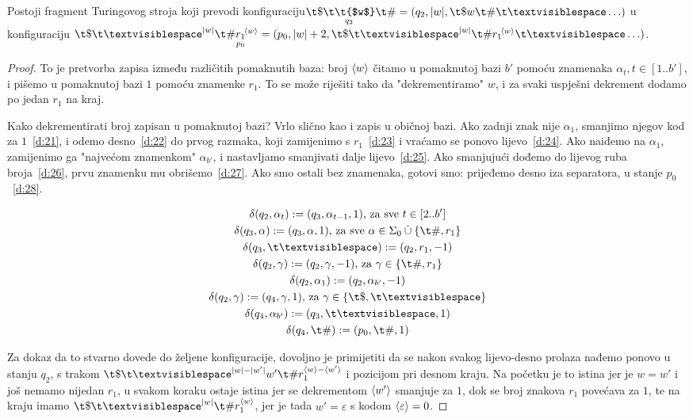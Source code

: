 \begin{lema}[{name=[drugi fragment transpiliranog stroja]}]\label{lm:faza2}
Postoji fragment Turingovog stroja koji prevodi konfiguraciju\newline $\T{\$}{q_2}{\t{$w$}}{\#}=(q_2,\dulj w,\t\$w\t\#\bl\ldots)$ u konfiguraciju $\t\$\bl^{\dulj w}\t\#\underset{\mathclap{p_0}}{r_1}^{\!\kr w}=(p_0,\dulj w+2,\t\$\bl^{\dulj w}\t\#r_1{}^{\!\kr w}\bl\ldots)$.
\end{lema}
\begin{proof}
To je pretvorba zapisa između različitih pomaknutih baza: broj $\langle w\rangle$ čitamo u pomaknutoj bazi $b'$ pomoću znamenaka $\alpha_t,t\in[1..b']$, i pišemo u pomaknutoj bazi $1$ pomoću znamenke $r_1$. To se može riješiti tako da "dekrementiramo" $w$, i za svaki uspješni dekrement dodamo po jedan $r_1$ na kraj.

Kako dekrementirati broj zapisan u pomaknutoj bazi? Vrlo slično kao i zapis u običnoj bazi. Ako zadnji znak nije $\alpha_1$, smanjimo njegov kod za $1$~\eqref{d:21}, i odemo desno~\eqref{d:22} do prvog razmaka, koji zamijenimo s $r_1$~\eqref{d:23} i vraćamo se ponovo lijevo~\eqref{d:24}. Ako naiđemo na $\alpha_1$, zamijenimo ga "najvećom znamenkom" $\alpha_{b'}$, i nastavljamo smanjivati dalje lijevo~\eqref{d:25}. Ako smanjujući dođemo do lijevog ruba broja~\eqref{d:26}, prvu znamenku mu obrišemo~\eqref{d:27}. Ako smo ostali bez znamenaka, gotovi smo: prijeđemo desno iza separatora, u stanje $p_0$~\eqref{d:28}.

\noindent\begin{gather}
\label{d:21}\delta(q_2,\alpha_t):=(q_3,\alpha_{t-1},1)\text{, za sve }t\in[2..b']\\
\label{d:22}\delta(q_3,\alpha):=(q_3,\alpha,1)\text{, za sve }\alpha\in\Sigma_0\mathbin{\dot\cup}\{\t\#,r_1\}\\
\label{d:23}\delta(q_3,\bl):=(q_2,r_1,-1)\\
\label{d:24}\delta(q_2,\gamma):=(q_2,\gamma,-1)\text{, za }\gamma\in\{\t\#,r_1\}\\
    \label{d:25}\delta(q_2,\alpha_1):=(q_2,\alpha_{b'},-1)\\
\label{d:26}\delta(q_2,\gamma):=(q_4,\gamma,1)\text{, za }\gamma\in\{\t\$,\bl\}\\
\label{d:27}\delta(q_4,\alpha_{b'}):=(q_3,\bl,1)\\
\label{d:28}\delta(q_4,\t\#):=(p_0,\t\#,1)
\end{gather}

Za dokaz da to stvarno dovede do željene konfiguracije, dovoljno je primijetiti da se nakon svakog lijevo-desno prolaza nađemo ponovo u stanju $q_2$, s trakom $\t\$\bl^{\dulj w-\dulj{w'}}w'\t\#r_1^{\kr w-\kr{w'}}$ i pozicijom pri desnom kraju. Na početku je to istina jer je $w=w'$ i još nemamo nijedan $r_1$, u svakom koraku ostaje istina jer se dekrementom $\langle w'\rangle$ smanjuje za $1$, dok se broj znakova $r_1$ povećava za $1$, te na kraju imamo $\t\$\bl^{\dulj w}\t\#r_1^{\kr w}$, jer je tada $w'=\varepsilon$ s kodom $\langle\varepsilon\rangle=0$.
\end{proof}

